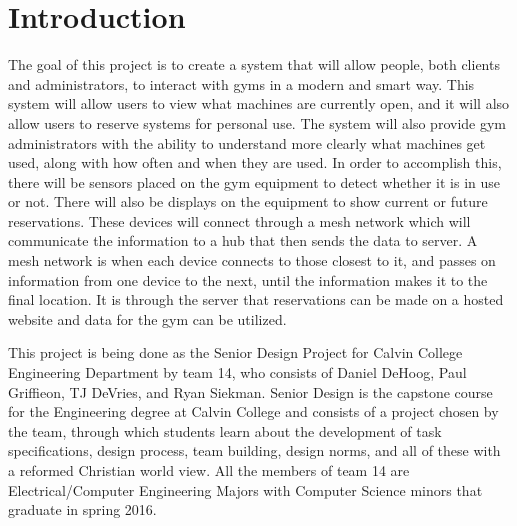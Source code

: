 \documentclass[PPFS.tex]{template/subfiles}
\begin{document}
\section{Introduction}

The goal of this project is to create a system that will allow people, both clients and administrators, to interact with gyms in a modern and smart way. This system will allow users to view what machines are currently open, and it will also allow users to reserve systems for personal use. The system will also provide gym administrators with the ability to understand more clearly what machines get used, along with how often and when they are used. In order to accomplish this, there will be sensors placed on the gym equipment to detect whether it is in use or not. There will also be displays on the equipment to show current or future reservations. These devices will connect through a mesh network which will communicate the information to a hub that then sends the data to server. A mesh network is when each device connects to those closest to it, and passes on information from one device to the next, until the information makes it to the final location. It is through the server that reservations can be made on a hosted website and data for the gym can be utilized. 

This project is being done as the Senior Design Project for Calvin College Engineering Department by team 14, who consists of Daniel DeHoog, Paul Griffieon, TJ DeVries, and Ryan Siekman. Senior Design is the capstone course for the Engineering degree at Calvin College and consists of a project chosen by the team, through which students learn about the development of task specifications, design process, team building, design norms, and all of these with a reformed Christian world view. All the members of team 14 are Electrical/Computer Engineering Majors with Computer Science minors that graduate in spring 2016. 
\end{document}
